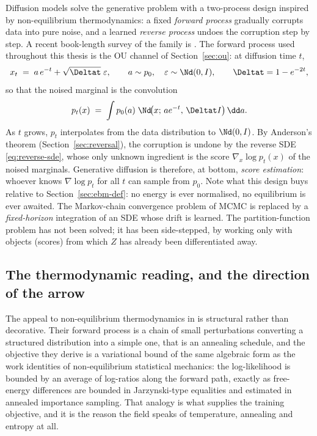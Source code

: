 Diffusion models \citep{sohl2015deep, ho2020denoising,
song2021scorebased} solve the generative problem with a two-process
design inspired by non-equilibrium thermodynamics: a fixed \emph{forward
process} gradually corrupts data into pure noise, and a learned
\emph{reverse process} undoes the corruption step by step. A recent
book-length survey of the family is \citet{lai2025principles}. The
forward process used throughout this thesis is the OU channel of
Section~\ref{sec:ou}: at diffusion time $t$,
\begin{equation}
  x_t \;=\; a\, e^{-t} + \sqrt{\Deltat}\;\varepsilon,
  \qquad a \sim p_0,\quad \varepsilon \sim \Nd(0, I),
  \qquad \Deltat = 1 - e^{-2t},
  \label{eq:forward-marginal}
\end{equation}
so that the noised marginal is the convolution
\begin{equation}
  p_t(x) \;=\; \int p_0(a)\; \Nd\!\big(x;\, a e^{-t},\, \Deltat I\big)\,
  \dd a .
  \label{eq:pt-convolution}
\end{equation}
As $t$ grows, $p_t$ interpolates from the data distribution to
$\Nd(0, I)$. By Anderson's theorem (Section~\ref{sec:reversal}), the
corruption is undone by the reverse SDE \eqref{eq:reverse-sde}, whose
only unknown ingredient is the score $\nabla_x \log p_t(x)$ of the noised
marginals. Generative diffusion is therefore, at bottom, \emph{score
estimation}: whoever knows $\nabla \log p_t$ for all $t$ can sample from
$p_0$. Note what this design buys relative to
Section~\ref{sec:ebm-def}: no energy is ever normalised, no equilibrium
is ever awaited. The Markov-chain convergence problem of MCMC is replaced
by a \emph{fixed-horizon} integration of an SDE whose drift is learned.
The partition-function problem has not been solved; it has been
side-stepped, by working only with objects (scores) from which $Z$ has
already been differentiated away.

\subsection{The thermodynamic reading, and the direction of the arrow}
\label{sec:diffusion-thermo}

The appeal to non-equilibrium thermodynamics in \citet{sohl2015deep} is
structural rather than decorative. Their forward process is a chain of small
perturbations converting a structured distribution into a simple one, that is
an annealing schedule, and the objective they derive is a variational bound of
the same algebraic form as the work identities of non-equilibrium statistical
mechanics: the log-likelihood is bounded by an average of log-ratios along the
forward path, exactly as free-energy differences are bounded in Jarzynski-type
equalities and estimated in annealed importance sampling. That analogy is what
supplies the training objective, and it is the reason the field speaks of
temperature, annealing and entropy at all.

